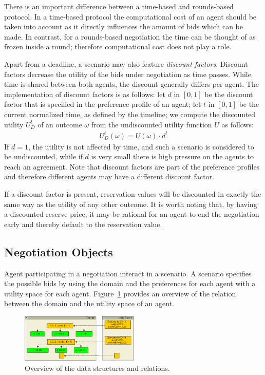 \documentclass[]{article}
\begin{document}
There is an important difference between a time-based and rounds-based protocol. In a time-based protocol the computational cost of an agent should be taken into account as it directly influences the amount of bids which can be made. In contrast, for a rounds-based negotiation the time can be thought of as frozen inside a round; therefore computational cost does not play a role.

Apart from a deadline, a scenario may also feature \emph{discount factors}. Discount factors decrease the utility of the bids under negotiation as time passes. While time is shared between both agents, the discount generally differs per agent. The implementation of discount factors is as follows: let $d$ in $[0, 1]$ be the discount factor that is specified in the preference profile of an agent; let $t$ in $[0, 1]$ be the current normalized time, as defined by the timeline; we compute the discounted utility $U_D^t$ of an outcome $\omega$ from the undiscounted utility function $U$ as follows:
\begin{eqnarray}
U_D^t(\omega) = U(\omega) \cdot d^t
\end{eqnarray}
If $d = 1$, the utility is not affected by time, and such a scenario is considered to be undiscounted, while if $d$ is very small there is high pressure on the agents to reach an agreement. Note that discount factors are part of the preference profiles and therefore different agents may have a different discount factor.

If a discount factor is present, reservation values will be discounted in exactly the same way as the utility of any other outcome. It is worth noting that, by having a discounted reserve price, it may be rational for an agent to end the negotiation early and thereby default to the reservation value.

\subsection{Negotiation Objects}
Agent participating in a negotiation interact in a scenario. A scenario specifies the possible bids by using the domain and the preferences for each agent with a utility space for each agent. Figure~\ref{Fig:overviewStructures} provides an overview of the relation between the domain and the utility space of an agent.

\begin{figure}[htb]
	\centering
	\includegraphics[width=0.5\textwidth]{media/datastructures.png}
	\caption{Overview of the data structures and relations.}\label{Fig:overviewStructures}
\end{figure}
\end{document}
